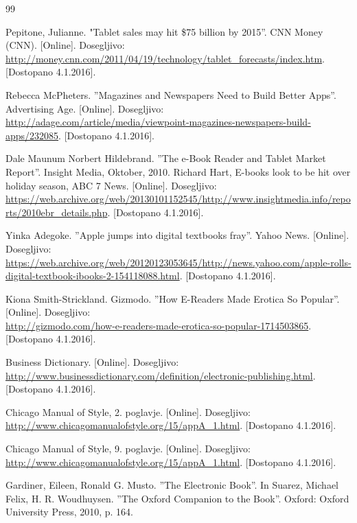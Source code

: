 \documentclass[a4paper, 12pt]{book}
\begin{document}
\begin{thebibliography}{99}


 Pepitone, Julianne. "Tablet sales may hit \$75 billion by 2015''. CNN Money (CNN). 
[Online]. Dosegljivo:\\
\url{http://money.cnn.com/2011/04/19/technology/tablet\_forecasts/index.htm}.
[Dostopano 4.1.2016].

 Rebecca McPheters. ''Magazines and Newspapers Need to Build Better Apps''. Advertising Age.
[Online]. Dosegljivo:\\ \url{http://adage.com/article/media/viewpoint-magazines-newspapers-build-apps/232085}.
[Dostopano 4.1.2016].

 Dale Maunum Norbert Hildebrand. ''The e-Book Reader and Tablet Market Report''. Insight Media, Oktober, 2010. Richard Hart, E-books look to be hit over holiday season, ABC 7 News.
[Online]. Dosegljivo:\\ 
\url{https://web.archive.org/web/20130101152545/http://www.insightmedia.info/reports/2010ebr\_details.php}.
[Dostopano 4.1.2016].

 Yinka Adegoke. ''Apple jumps into digital textbooks fray''. Yahoo News.
[Online]. Dosegljivo:\\ 
\url{https://web.archive.org/web/20120123053645/http://news.yahoo.com/apple-rolls-digital-textbook-ibooks-2-154118088.html}.
[Dostopano 4.1.2016].

Kiona Smith-Strickland. Gizmodo. ''How E-Readers Made Erotica So Popular''.
[Online]. Dosegljivo:\\
\url{http://gizmodo.com/how-e-readers-made-erotica-so-popular-1714503865}.
[Dostopano 4.1.2016].

Business Dictionary.
[Online]. Dosegljivo:\\
\url{http://www.businessdictionary.com/definition/electronic-publishing.html}.
[Dostopano 4.1.2016].
 
 Chicago Manual of Style, 2. poglavje.
[Online]. Dosegljivo:\\ 
\url{http://www.chicagomanualofstyle.org/15/appA\_1.html}.
[Dostopano 4.1.2016].
 
 Chicago Manual of Style, 9. poglavje.
[Online]. Dosegljivo:\\ 
\url{http://www.chicagomanualofstyle.org/15/appA\_1.html}.
[Dostopano 4.1.2016].

 Gardiner, Eileen, Ronald G. Musto. ''The Electronic Book''. In Suarez, Michael Felix, H. R. Woudhuysen. ''The Oxford Companion to the Book''. Oxford: Oxford University Press, 2010, p. 164.


\end{thebibliography}
\end{document}
